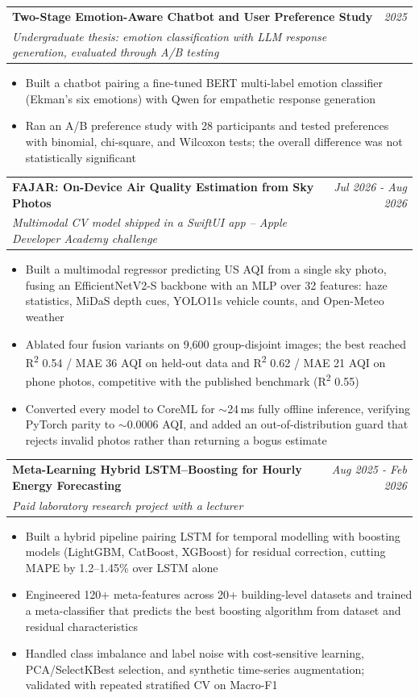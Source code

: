 \documentclass[a4paper,11pt]{article}
\makeatletter
\newcommand{\resumeProject}[4]{
\vspace{0.5mm}\item
    \begin{tabular*}{0.98\textwidth}[t]{l@{\extracolsep{\fill}}r}
        \textbf{#1} & \textit{\footnotesize{#3}} \\
        \footnotesize{\textit{#2}} & \footnotesize{#4}
    \end{tabular*}
    \vspace{-2.4mm}
}
\newcommand{\resumeItemListStart}{\begin{justify}\begin{itemize}[leftmargin=3ex, rightmargin=2ex, noitemsep,labelsep=1.2mm,itemsep=0mm]\small}
\newcommand{\resumeItemListEnd}{\end{itemize}\end{justify}\vspace{-2mm}}
\makeatother
\begin{document}
\resumeProject
  {Two-Stage Emotion-Aware Chatbot and User Preference Study}
  {Undergraduate thesis: emotion classification with LLM response generation, evaluated through A/B testing}
  {2025}{}
  \resumeItemListStart
    \item {Built a chatbot pairing a fine-tuned BERT multi-label emotion classifier (Ekman's six emotions) with Qwen for empathetic response generation}
    \item {Ran an A/B preference study with 28 participants and tested preferences with binomial, chi-square, and Wilcoxon tests; the overall difference was not statistically significant}
  \resumeItemListEnd
  \vspace{-2mm}

\resumeProject
  {FAJAR: On-Device Air Quality Estimation from Sky Photos}
  {Multimodal CV model shipped in a SwiftUI app -- Apple Developer Academy challenge}
  {Jul 2026 - Aug 2026}{}
  \resumeItemListStart
    \item {Built a multimodal regressor predicting US AQI from a single sky photo, fusing an EfficientNetV2-S backbone with an MLP over 32 features: haze statistics, MiDaS depth cues, YOLO11s vehicle counts, and Open-Meteo weather}
    \item {Ablated four fusion variants on 9,600 group-disjoint images; the best reached R\textsuperscript{2} 0.54 / MAE 36 AQI on held-out data and R\textsuperscript{2} 0.62 / MAE 21 AQI on phone photos, competitive with the published benchmark (R\textsuperscript{2} 0.55)}
    \item {Converted every model to CoreML for $\sim$24\,ms fully offline inference, verifying PyTorch parity to $\sim$0.0006 AQI, and added an out-of-distribution guard that rejects invalid photos rather than returning a bogus estimate}
  \resumeItemListEnd
  \vspace{-2mm}

\resumeProject
  {Meta-Learning Hybrid LSTM--Boosting for Hourly Energy Forecasting}
  {Paid laboratory research project with a lecturer}
  {Aug 2025 - Feb 2026}{}
  \resumeItemListStart
    \item {Built a hybrid pipeline pairing LSTM for temporal modelling with boosting models (LightGBM, CatBoost, XGBoost) for residual correction, cutting MAPE by 1.2--1.45\% over LSTM alone}
    \item {Engineered 120+ meta-features across 20+ building-level datasets and trained a meta-classifier that predicts the best boosting algorithm from dataset and residual characteristics}
    \item {Handled class imbalance and label noise with cost-sensitive learning, PCA/SelectKBest selection, and synthetic time-series augmentation; validated with repeated stratified CV on Macro-F1}
  \resumeItemListEnd
  \vspace{-2mm}
\end{document}
